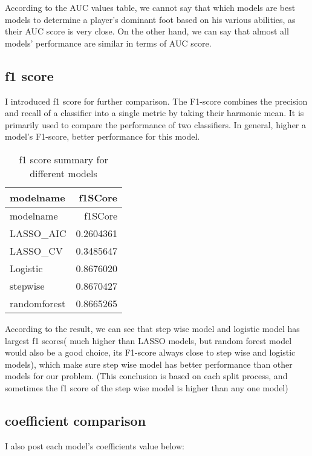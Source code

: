 \documentclass[
]{article}
\begin{document}
According to the AUC values table, we cannot say that which models are
best models to determine a player's dominant foot based on his various
abilities, as their AUC score is very close. On the other hand, we can
say that almost all models' performance are similar in terms of AUC
score.

\hypertarget{f1-score}{%
\subsection{f1 score}\label{f1-score}}

I introduced f1 score for further comparison. The F1-score combines the
precision and recall of a classifier into a single metric by taking
their harmonic mean. It is primarily used to compare the performance of
two classifiers. In general, higher a model's F1-score, better
performance for this model.

\begin{longtable}[]{@{}lr@{}}
\caption{f1 score summary for different models}\tabularnewline
\toprule
modelname & f1SCore \\
\midrule
\endfirsthead
\toprule
modelname & f1SCore \\
\midrule
\endhead
LASSO\_AIC & 0.2604361 \\
LASSO\_CV & 0.3485647 \\
Logistic & 0.8676020 \\
stepwise & 0.8670427 \\
randomforest & 0.8665265 \\
\bottomrule
\end{longtable}

According to the result, we can see that step wise model and logistic
model has largest f1 scores( much higher than LASSO models, but random
forest model would also be a good choice, its F1-score always close to
step wise and logistic models), which make sure step wise model has
better performance than other models for our problem. (This conclusion
is based on each split process, and sometimes the f1 score of the step
wise model is higher than any one model)

\hypertarget{coefficient-comparison}{%
\subsection{coefficient comparison}\label{coefficient-comparison}}

I also post each model's coefficients value below:
\end{document}
